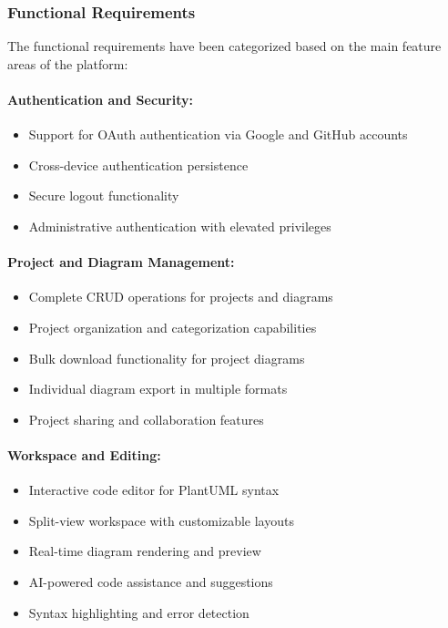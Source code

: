 \subsubsection{Functional Requirements}

The functional requirements have been categorized based on the main feature areas of the platform:

\paragraph{Authentication and Security:}
\begin{itemize}
    \item Support for OAuth authentication via Google and GitHub accounts
    \item Cross-device authentication persistence
    \item Secure logout functionality
    \item Administrative authentication with elevated privileges
\end{itemize}

\paragraph{Project and Diagram Management:}
\begin{itemize}
    \item Complete CRUD operations for projects and diagrams
    \item Project organization and categorization capabilities
    \item Bulk download functionality for project diagrams
    \item Individual diagram export in multiple formats
    \item Project sharing and collaboration features
\end{itemize}

\paragraph{Workspace and Editing:}
\begin{itemize}
    \item Interactive code editor for PlantUML syntax
    \item Split-view workspace with customizable layouts
    \item Real-time diagram rendering and preview
    \item AI-powered code assistance and suggestions
    \item Syntax highlighting and error detection
\end{itemize}


